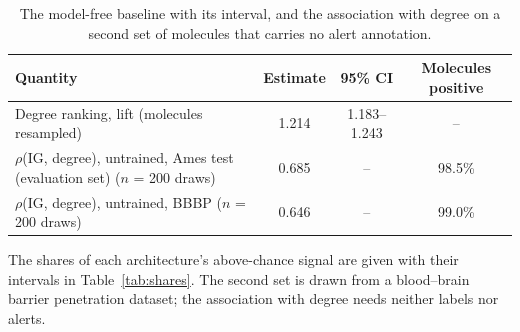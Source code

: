 \begin{table}[htbp]
\centering
\caption{The model-free baseline with its interval, and the association with degree on a second set of molecules that carries no alert annotation.}
\label{tab:intervals}
\small
\setlength{\tabcolsep}{4pt}
\begin{tabular}{lccc}
\toprule
Quantity & Estimate & 95\% CI & Molecules positive \\
\midrule
Degree ranking, lift (molecules resampled) & 1.214 & 1.183--1.243 & -- \\
$\rho$(IG, degree), untrained, Ames test (evaluation set) ($n$ = 200 draws) & 0.685 & -- & 98.5\% \\
$\rho$(IG, degree), untrained, BBBP ($n$ = 200 draws) & 0.646 & -- & 99.0\% \\
\bottomrule
\end{tabular}
\begin{flushleft}\footnotesize The shares of each architecture's above-chance signal are given with their intervals in Table~\ref{tab:shares}. The second set is drawn from a blood--brain barrier penetration dataset; the association with degree needs neither labels nor alerts.\end{flushleft}
\end{table}
